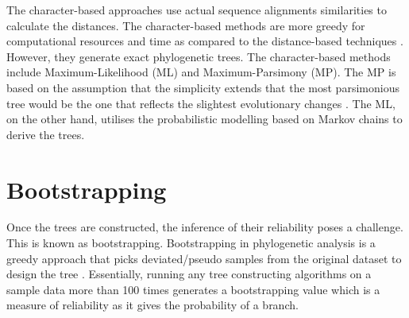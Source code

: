 The character-based approaches use actual sequence alignments similarities to calculate the distances. The character-based methods are more greedy for computational resources and time as compared to the distance-based techniques \cite{munjal_2019_phylogenetics}. However, they generate exact phylogenetic trees. The character-based methods include Maximum-Likelihood (ML) and Maximum-Parsimony (MP). The MP is based on the assumption that the simplicity extends that the most parsimonious tree would be the one that reflects the slightest evolutionary changes \cite{munjal_2019_phylogenetics}. The ML, on the other hand, utilises the probabilistic modelling based on Markov chains to derive the trees.

\section*{Bootstrapping}

Once the trees are constructed, the inference of their reliability poses a challenge. This is known as bootstrapping. Bootstrapping in phylogenetic analysis is a greedy approach that picks deviated/pseudo samples from the original dataset to design the tree \cite{lemoine_2018_renewing}. Essentially, running any tree constructing algorithms on a sample data more than 100 times generates a bootstrapping value which is a measure of reliability as it gives the probability of a branch.
